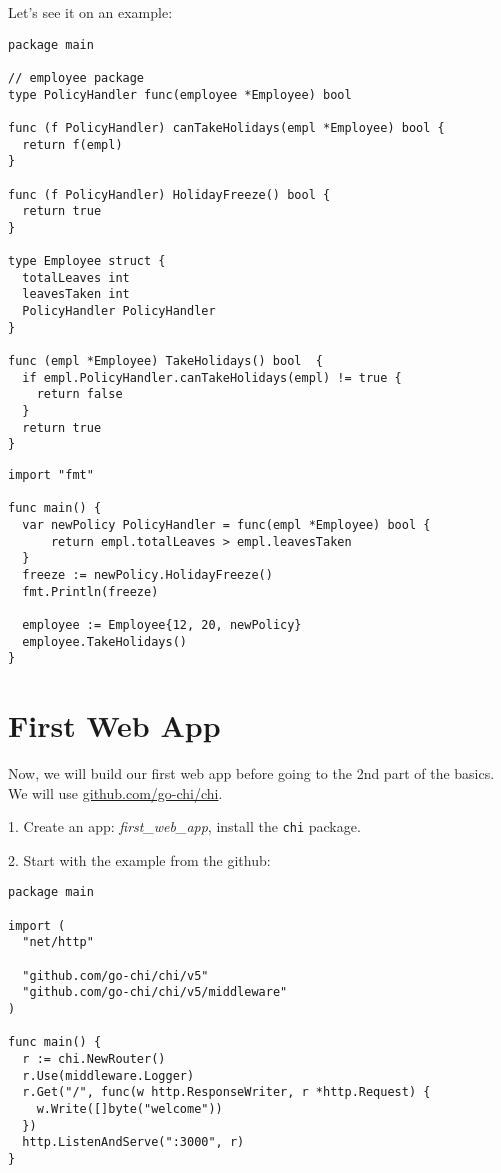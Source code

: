 \documentclass[11pt, letterpaper]{article}
\begin{document}
Let's see it on an example:

\begin{verbatim}
package main

// employee package
type PolicyHandler func(employee *Employee) bool

func (f PolicyHandler) canTakeHolidays(empl *Employee) bool {
  return f(empl)
}

func (f PolicyHandler) HolidayFreeze() bool {
  return true
}

type Employee struct {
  totalLeaves int
  leavesTaken int
  PolicyHandler PolicyHandler
}

func (empl *Employee) TakeHolidays() bool  {
  if empl.PolicyHandler.canTakeHolidays(empl) != true {
    return false
  }
  return true
}
\end{verbatim}

\begin{verbatim}
import "fmt"

func main() {
  var newPolicy PolicyHandler = func(empl *Employee) bool {
      return empl.totalLeaves > empl.leavesTaken
  }
  freeze := newPolicy.HolidayFreeze()
  fmt.Println(freeze)

  employee := Employee{12, 20, newPolicy}
  employee.TakeHolidays()
}
\end{verbatim}

\section{First Web App}

Now, we will build our first web app before going to the 2nd part of the basics. We will use \href{https://github.com/go-chi/chi}{github.com/go-chi/chi}.

1. Create an app: \emph{first\_web\_app}, install the \verb|chi| package.

\bigskip

2. Start with the example from the github:

\begin{verbatim}
package main

import (
  "net/http"

  "github.com/go-chi/chi/v5"
  "github.com/go-chi/chi/v5/middleware"
)

func main() {
  r := chi.NewRouter()
  r.Use(middleware.Logger)
  r.Get("/", func(w http.ResponseWriter, r *http.Request) {
    w.Write([]byte("welcome"))
  })
  http.ListenAndServe(":3000", r)
}
\end{verbatim}
\end{document}
